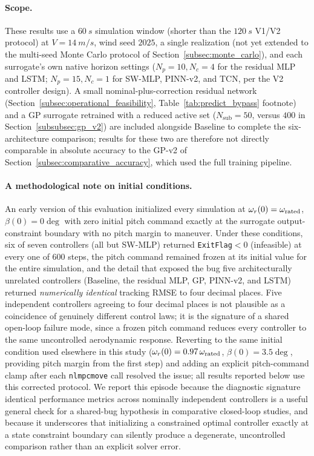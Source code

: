 \paragraph{Scope.} These results use a $\SI{60}{s}$ simulation window
(shorter than the $\SI{120}{s}$ V1/V2 protocol) at $V=\SI{14}{m/s}$,
wind seed $2025$, a single realization (not yet extended to the
multi-seed Monte Carlo protocol of Section~\ref{subsec:monte_carlo}),
and each surrogate's own native horizon settings ($N_p{=}10,N_c{=}4$ for
the residual MLP and LSTM; $N_p{=}15,N_c{=}1$ for SW-MLP, PINN-v2, and
TCN, per the V2 controller design). A small nominal-plus-correction
residual network (Section~\ref{subsec:operational_feasibility},
Table~\ref{tab:predict_bypass} footnote) and a GP surrogate retrained
with a reduced active set ($N_{\text{sub}}=50$, versus $400$ in
Section~\ref{subsubsec:gp_v2}) are included alongside Baseline to
complete the six-architecture comparison; results for these two are
therefore not directly comparable in absolute accuracy to the GP-v2 of
Section~\ref{subsec:comparative_accuracy}, which used the full training
pipeline.

\paragraph{A methodological note on initial conditions.} An early
version of this evaluation initialized every simulation at
$\omega_r(0)=\omega_{\text{rated}}$, $\beta(0)=0\deg$ with zero initial pitch
command  exactly at the surrogate output-constraint boundary with no
pitch margin to maneuver. Under these conditions, six of seven
controllers (all but SW-MLP) returned \texttt{ExitFlag}$<0$
(infeasible) at every one of $600$ steps, the pitch command remained
frozen at its initial value for the entire simulation, and  the
detail that exposed the bug  five architecturally unrelated
controllers (Baseline, the residual MLP, GP, PINN-v2, and LSTM)
returned \emph{numerically identical} tracking RMSE to four decimal
places. Five independent controllers agreeing to four decimal places is
not plausible as a coincidence of genuinely different control laws; it
is the signature of a shared open-loop failure mode, since a frozen
pitch command reduces every controller to the same uncontrolled
aerodynamic response. Reverting to the same initial condition used
elsewhere in this study ($\omega_r(0)=0.97\,\omega_{\text{rated}}$,
$\beta(0)=3.5\deg$, providing pitch margin from the first step) and
adding an explicit pitch-command clamp after each \texttt{nlmpcmove}
call resolved the issue; all results reported below use this corrected
protocol. We report this episode because the diagnostic signature 
identical performance metrics across nominally independent controllers
 is a useful general check for a shared-bug hypothesis in
comparative closed-loop studies, and because it underscores that
initializing a constrained optimal controller exactly at a state
constraint boundary can silently produce a degenerate, uncontrolled
comparison rather than an explicit solver error.

